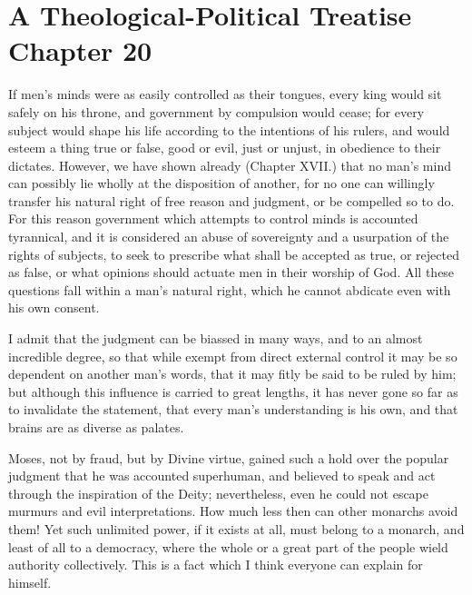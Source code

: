 
\author{Benedict de Spinoza}
\chapter[Benedict de Spinoza -- A Theological-Political Treatise,
chap. 20]{A Theological-Political Treatise\\\smaller Chapter 20}



If men's minds were as easily controlled as their tongues,
every king would sit safely on his throne, and government by
compulsion would cease; for every subject would shape his life
according to the intentions of his rulers, and would esteem a thing
true or false, good or evil, just or unjust, in obedience to their
dictates. However, we have shown already (Chapter XVII.) that no man's
mind can possibly lie wholly at the disposition of another, for no
one can willingly transfer his natural right of free reason and
judgment, or be compelled so to do. For this reason government which
attempts to control minds is accounted tyrannical, and it is
considered an abuse of sovereignty and a usurpation of the rights of
subjects, to seek to prescribe what shall be accepted as true, or
rejected as false, or what opinions should actuate men in their
worship of God. All these questions fall within a man's natural right,
which he cannot abdicate even with his own consent.

I admit that the judgment can be biassed in many ways, and to an
almost incredible degree, so that while exempt from direct external
control it may be so dependent on another man's words, that it may
fitly be said to be ruled by him; but although this influence is
carried to great lengths, it has never gone so far as to invalidate
the statement, that every man's understanding is his own, and that
brains are as diverse as palates.

Moses, not by fraud, but by Divine virtue, gained such a hold over the
popular judgment that he was accounted superhuman, and believed to
speak and act through the inspiration of the Deity; nevertheless, even
he could not escape murmurs and evil interpretations. How much less
then can other monarchs avoid them! Yet such unlimited power, if it
exists at all, must belong to a monarch, and  least of all
to a democracy, where the whole or a great part of the people wield
authority collectively. This is a fact which I think everyone can
explain for himself.

